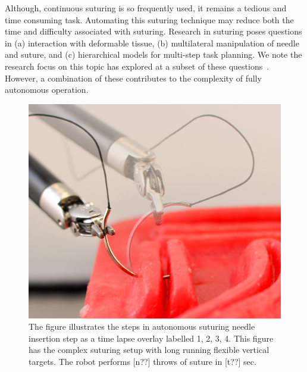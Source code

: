 
Although, continuous suturing is so frequently used, it remains a tedious and time consuming task. Automating this suturing technique may reduce both the time and difficulty associated with suturing. Research in suturing poses questions in (a) interaction with deformable tissue, (b) multilateral manipulation of needle and suture, and (c) hierarchical models for multi-step task planning. We note the research focus on this topic has explored at a subset of these questions~. However, a combination of these contributes to the complexity of fully autonomous operation.

\begin{figure}[!t]
\centering
\includegraphics[width=0.9\linewidth]{figures/NeedleInsertionCombo}
\caption{ The figure illustrates the steps in autonomous suturing needle insertion step as a time lapse overlay labelled 1, 2, 3, 4. This figure has the complex suturing setup with long running flexible vertical targets. The robot performs [n??] throws of suture in [t??] sec.}
\label{fig:intro}
\vspace{-10pt}
\end{figure}

